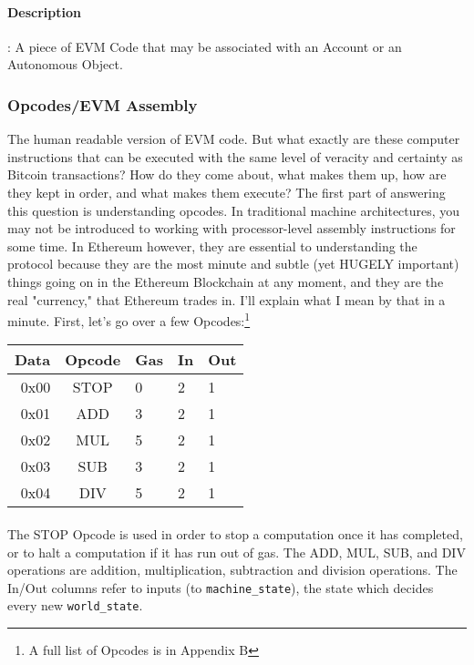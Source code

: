 \documentclass[10pt,a4paper,leqno,bibliography=totoc]{scrartcl}
\newenvironment{alphafootnotes}
{\par\edef\savedfootnotenumber{\number\value{footnote}}
\renewcommand{\thefootnote}{\alph{footnote}}
\setcounter{footnote}{0}}
{\par\setcounter{footnote}{\savedfootnotenumber}}
\begin{document}
\begin{alphafootnotes}
\begin{multicols*}{2}
				\paragraph{Description}: A piece of EVM Code that may be associated with an Account or an Autonomous Object. 

			\subsubsection{Opcodes/EVM Assembly}
		The human readable version of EVM code. But what exactly are these computer instructions that can be executed with the same level of veracity and certainty as Bitcoin transactions? How do they come about, what makes them up, how are they kept in order, and what makes them execute? The first part of answering this question is understanding opcodes. In traditional machine architectures, you may not be introduced to working with processor-level assembly instructions for some time. In Ethereum however, they are essential to understanding the protocol because they are the most minute and subtle (yet HUGELY important) things going on in the Ethereum Blockchain at any moment, and they are the real "currency," that Ethereum trades in. I'll explain what I mean by that in a minute. First, let's go over a few Opcodes:\footnote{A full list of Opcodes is in Appendix B} \\

\begin{tabular}{|rclll|}
	\hline
	\textbf{Data} & \textbf{Opcode} & \textbf{Gas} & \textbf{In} & \textbf{Out}  \\
	\hline
	0x00 & STOP & 0 & 2 & 1 \\
	0x01 & ADD & 3 & 2 & 1 \\
	0x02 & MUL & 5 & 2 & 1 \\
	0x03 & SUB & 3 & 2 & 1 \\
	0x04 & DIV & 5 & 2 & 1 \\ 
	\hline
\end{tabular}

				\paragraph{}The STOP Opcode is used in order to stop a computation once it has completed, or to halt a computation if it has run out of gas. The ADD, MUL, SUB, and DIV operations are addition, multiplication, subtraction and division operations. The In/Out columns refer to inputs (to \texttt{machine\_state}), the state which decides every new \texttt{world\_state}. 


\end{multicols*}
\end{alphafootnotes}
\end{document}

